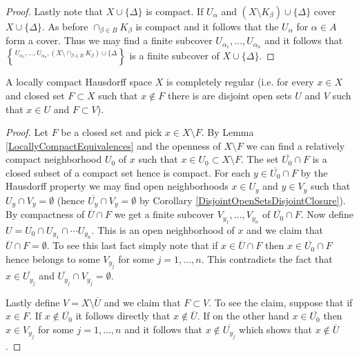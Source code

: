 \begin{proof}
Lastly note that $X \cup \lbrace \Delta \rbrace$ is compact.  If $U_\alpha$ and $(X \setminus K_\beta) \cup \lbrace \Delta \rbrace$ cover $X \cup \lbrace \Delta \rbrace$.  As before $\cap_{\beta \in B} K_\beta$ is compact and it follows that the $U_\alpha$ for $\alpha \in A$ form a cover.  Thus we may find a finite subcover $U_{\alpha_1}, \dotsc, U_{\alpha_n}$
and it follows that $U_{\alpha_1}, \dotsc, U_{\alpha_n}, (X \setminus \cap_{\beta \in B} K_\beta) \cup \lbrace \Delta \brace$ is a finite subcover of $X \cup \lbrace \Delta \rbrace$.
\end{proof}

\begin{prop}\label{CompleteRegularityLCH}A locally compact Hausdorff space $X$ is completely regular
  (i.e. for every $x \in X$ and closed set $F \subset X$ such that $x
  \notin F$ there is are disjoint open sets $U$ and $V$ such that $x
  \in U$ and $F \subset V$).
\end{prop}
\begin{proof}
Let $F$ be a closed set and pick $x \in X \setminus F$.  By Lemma
\ref{LocallyCompactEquivalences} and the openness of $X \setminus F$
we can find a relatively compact neighborhood $U_0$ of $x$ such that $x
\in U_0 \subset X \setminus F$.  The set $\overline{U_0} \cap F$ is a closed subset of a compact
set hence is compact.  For each $y \in \overline{U_0} \cap F$ by the
Hausdorff property we may find open neighborhoods $x \in U_y$ and $y
\in V_y$ such that $U_y \cap V_y = \emptyset$ (hence $\overline{U_y} \cap V_y = \emptyset$ by Corollary \ref{DisjointOpenSetsDisjointClosure}).  By compactness of
$\overline{U} \cap F$ we get a finite subcover $V_{y_1}, \dotsc,
V_{y_n}$ of $\overline{U_0} \cap F$.  Now define $U = U_0 \cap U_{y_1}
\cap \dotsb U_{y_n}$.  This is an open neighborhood of $x$ and
we claim that $\overline{U} \cap F = \emptyset$.  To see this last fact simply note that if $x \in \overline{U} \cap F$ then $x \in \overline{U_0} \cap F$ hence belongs to 
some $V_{y_j}$ for some $j=1, \dotsc, n$.  This contradicts the fact that $x \in \overline{U_{y_j}}$ and $\overline{U_{y_j}} \cap V_{y_j} = \emptyset$.  

Lastly define $V = X \setminus \overline{U}$ and we claim that $F \subset V$.  To see the claim, suppose that if $x \in F$.  If $x \notin \overline{U_0}$ it follows directly that $x \notin \overline{U}$.  If on the other hand $x \in \overline{U_0}$ then $x \in V_{y_j}$ for some $j=1, \dotsc, n$ and it follows that $x \notin \overline{U_{y_j}}$ which shows that $x \notin \overline{U}$.
\end{proof}


